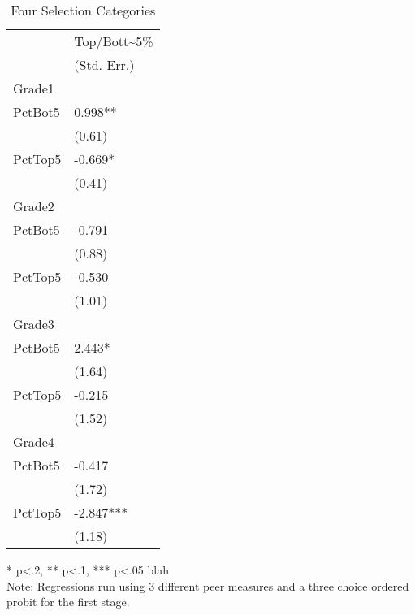 \begin{table}[htb]
  \centering
  \begin{threeparttable}
    \caption{Four Selection Categories}\label{tab:4sc}
    \begin{tabular}{l @{\hskip 1in} l} 
      \hline
      \hline
              & Top/Bott{\textasciitilde}5\% \\
              & (Std. Err.)                  \\
      \hline
      Grade1  &                              \\
      PctBot5 & 0.998**                      \\
              & (0.61)                       \\
      PctTop5 & -0.669*                      \\
              & (0.41)                       \\
      \hline
      Grade2  &                              \\
      PctBot5 & -0.791                       \\
              & (0.88)                       \\
      PctTop5 & -0.530                       \\
              & (1.01)                       \\
      \hline
      Grade3  &                              \\
      PctBot5 & 2.443*                       \\
              & (1.64)                       \\
      PctTop5 & -0.215                       \\
              & (1.52)                       \\
      \hline
      Grade4  &                              \\
      PctBot5 & -0.417                       \\
              & (1.72)                       \\
      PctTop5 & -2.847***                    \\
              & (1.18)                       \\
      \hline
      \hline
    \end{tabular}
    \begin{tablenotes}
    \item{* p<.2, ** p<.1, *** p<.05 blah \\Note: Regressions run using 3 different peer measures and a three choice ordered probit for the first stage.}
    \end{tablenotes}
  \end{threeparttable}
\end{table}


